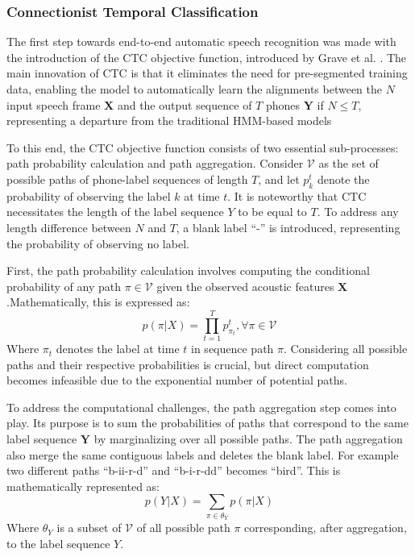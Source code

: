  
 \subsubsection{Connectionist Temporal Classification}
 The first step towards end-to-end automatic speech recognition was made with the introduction of the \ac{CTC} objective function, introduced by Grave et al. \cite{First_End2End}. The main innovation of \ac{CTC} is that it eliminates the need for pre-segmented training data, enabling the model to automatically learn the alignments between the $N$ input speech frame $\boldsymbol{X}$ and the output sequence of $T$ phones $\boldsymbol{Y}$ if $N \leq T$, representing a departure from the traditional HMM-based models

 To this end, the \ac{CTC} objective function consists of two essential sub-processes: path probability calculation and path aggregation. Consider $\mathcal{V}$ as the set of possible paths of phone-label sequences of length $T$, and let $p^t_k$ denote the probability of observing the label $k$ at time $t$. It is noteworthy that \ac{CTC} necessitates the length of the label sequence $Y$ to be equal to $T$. To address any length difference between $N$ and $T$, a blank label ``-'' is introduced, representing the probability of observing no label. 
 
 First, the path probability calculation involves computing the conditional probability of any path $\pi \in \mathcal{V}$ given the observed acoustic features $\boldsymbol{X}$.Mathematically, this is expressed as:
 \begin{equation}
    p(\pi|X) = \prod_{t=1}^{T}p_{\pi_t}^{t} , \forall \pi \in \mathcal{V}
\end{equation}
 Where $\pi_t$ denotes the label at time $t$ in sequence path $\pi$. Considering all possible paths and their respective probabilities is crucial, but direct computation becomes infeasible due to the exponential number of potential paths.
 
 To address the computational challenges, the path aggregation step comes into play. Its purpose is to sum the probabilities of paths that correspond to the same label sequence $\boldsymbol{Y}$ by marginalizing over all possible paths. The path aggregation also merge the same contiguous labels and deletes the blank label. For example two different paths ``b-ii-r-d'' and ``b-i-r-dd'' becomes ``bird''. This is mathematically represented as:
\begin{equation}
    p(Y|X) = \sum_{\pi \in \theta_Y}p(\pi|X)
\end{equation}
Where $\theta_Y$ is a subset of $\mathcal{V}$ of all possible path $\pi$ corresponding, after aggregation, to the label sequence $Y$.

